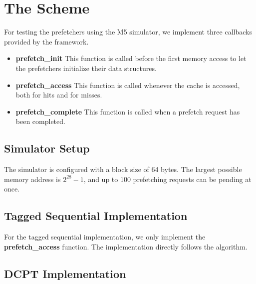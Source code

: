 \section{The Scheme}

For testing the prefetchers using the M5 simulator, we implement three callbacks
provided by the framework.

\begin{itemize}
	\item \textbf{prefetch\_init}
		This function is called before the first memory access to let the
        prefetchers initialize their data structures.
	\item \textbf{prefetch\_access}
		This function is called whenever the cache is accessed, both for hits and
        for misses.
	\item \textbf{prefetch\_complete}
        This function is called when a prefetch request has been completed.
\end{itemize}

\subsection{Simulator Setup}


The simulator is configured with a block size of 64 bytes. The largest possible
memory address is $2^{28}-1$, and up to 100 prefetching requests can be pending at
once.

\subsection{Tagged Sequential Implementation}


For the tagged sequential implementation, we only implement the
\textbf{prefetch\_access} function. The implementation directly follows the
algorithm.

\subsection{DCPT Implementation}

